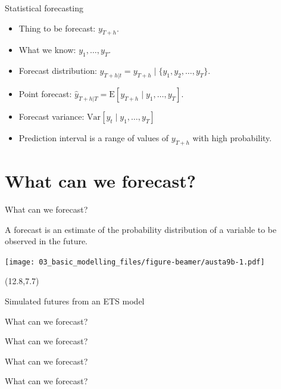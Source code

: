 \documentclass[
  14pt,
  ignorenonframetext,
  aspectratio=169,
]{beamer}
\providecommand{\tightlist}{%
  \setlength{\itemsep}{0pt}\setlength{\parskip}{0pt}}\usepackage{longtable,booktabs,array}
\def\forecast{\begin{alertblock}{}\fontsize{10}{11}\sf
 A forecast is an estimate of the probability distribution of a variable to be observed in the future.
\end{alertblock}}
\def\simfutures{\begin{textblock}{2.9}(12.8,7.7)
\begin{block}{}\fontsize{10}{11}\sf
Simulated futures from an ETS model
\end{block}\end{textblock}}
\begin{document}
\begin{frame}{Statistical forecasting}
\protect\hypertarget{statistical-forecasting-1}{}
\begin{itemize}
\tightlist
\item
  Thing to be forecast: \(y_{T+h}\).
\item
  What we know: \(y_1,\dots,y_T\).
\item
  Forecast distribution:
  \({y}_{T+h|t} = y_{T+h} \mid \{y_1,y_2,\dots,y_{T}\}\).
\item
  Point forecast:
  \(\hat{y}_{T+h|T} =\text{E}[y_{T+h} \mid y_1,\dots,y_T]\).
\item
  Forecast variance: \(\text{Var}[y_{t} \mid y_1,\dots,y_T]\)
\item
  Prediction interval is a range of values of \(y_{T+h}\) with high
  probability.
\end{itemize}
\end{frame}

\hypertarget{what-can-we-forecast}{%
\section{What can we forecast?}\label{what-can-we-forecast}}

\begin{frame}{What can we forecast?}
\protect\hypertarget{what-can-we-forecast-1}{}
\forecast

\texttt{[image: 03\_basic\_modelling\_files/figure-beamer/austa9b-1.pdf]}

\simfutures
\end{frame}

\begin{frame}{What can we forecast?}
\protect\hypertarget{what-can-we-forecast-2}{}
\end{frame}

\begin{frame}{What can we forecast?}
\protect\hypertarget{what-can-we-forecast-3}{}
\end{frame}

\begin{frame}{What can we forecast?}
\protect\hypertarget{what-can-we-forecast-4}{}
\end{frame}

\begin{frame}{What can we forecast?}
\protect\hypertarget{what-can-we-forecast-5}{}
\end{frame}
\end{document}
